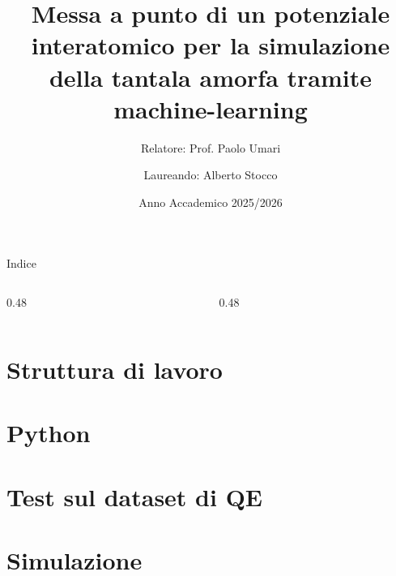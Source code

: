 \documentclass[aspectratio=169, 10pt]{beamer} %
\title[Potenziale interatomico tramite machine-learning]{Messa a punto di un potenziale interatomico per la simulazione della tantala amorfa tramite machine-learning}
\subtitle{}
\author[Alberto Stocco]{Relatore: Prof. Paolo Umari \and Laureando: Alberto Stocco}
\date{Anno Accademico 2025/2026}
\begin{document}
\begin{frame}
    \titlepage    
\end{frame}


\begin{frame}{Indice}
    \begin{columns}[t]
        \begin{column}{0.48\textwidth}
            \tableofcontents[sections={1-2}]
        \end{column}
        \begin{column}{0.48\textwidth}
            \tableofcontents[sections={3-4}]
        \end{column}
    \end{columns}
\end{frame}



\section{Struttura di lavoro}


\section{Python}


\section{Test sul dataset di QE}


\section{Simulazione}




\end{document}
